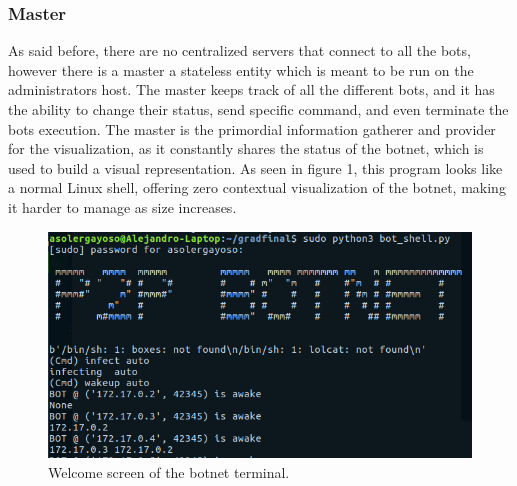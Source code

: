 \documentclass{proc}
\begin{document}
\subsubsection{Master}
As said before, there are no centralized servers that connect to all the bots, however there is a master a stateless entity which is meant to be run on the administrators host. The master keeps track of all the different bots, and it has the ability to change their status, send specific command, and even terminate the bots execution. The master is the primordial information gatherer and provider for the visualization, as it constantly shares the status of the botnet, which is used to build a visual representation. As seen in figure 1, this program looks like a normal Linux shell, offering zero contextual visualization of the botnet, making it harder to manage as size increases. 
\begin{figure}
  \includegraphics[width=\linewidth]{init_screen.png}
  \caption{Welcome screen of the botnet terminal.}
  \label{fig1 :node select}
\end{figure}
\end{document}
